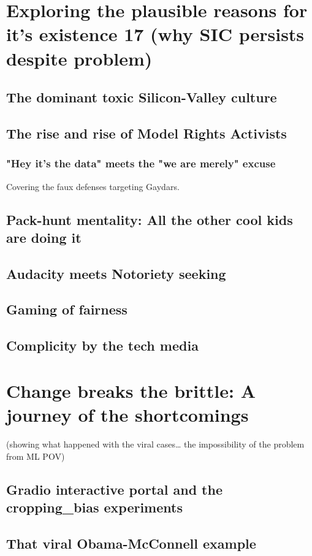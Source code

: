 \documentclass[letterpaper]{article} %
\begin{document}
\section{Exploring the plausible reasons for it’s existence 17 (why SIC persists despite problem) }
\subsection{The dominant toxic Silicon-Valley culture}
\subsection{The rise and rise of Model Rights Activists}
\subsubsection{"Hey it’s the data" meets the "we are merely" excuse}
Covering the faux defenses targeting Gaydars.
\subsection{Pack-hunt mentality: All the other cool kids are doing it}    

\subsection{Audacity meets Notoriety seeking}
\subsection{Gaming of fairness}
\subsection{Complicity by the tech media}
\section{Change breaks the brittle: A journey of the shortcomings}
(showing what happened with the viral cases… the impossibility of the problem from ML POV) 
\subsection{Gradio interactive portal and the cropping\_bias experiments}
\subsection{That viral Obama-McConnell example}
\end{document}
